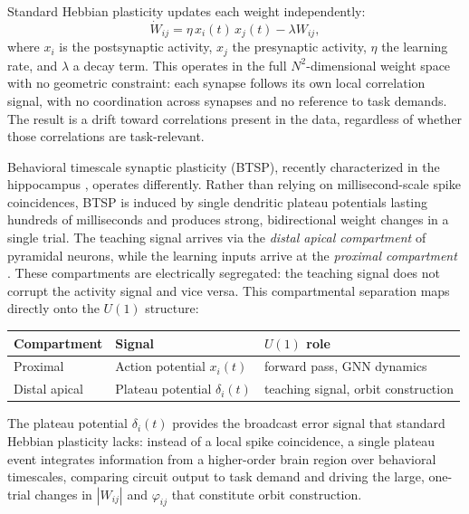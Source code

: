\documentclass[11pt]{article}
\begin{document}
Standard Hebbian plasticity updates each weight independently:
\begin{equation}
\dot{W}_{ij} = \eta\, x_i(t)\, x_j(t) - \lambda W_{ij},
\label{eq:hebbian}
\end{equation}
where $x_i$ is the postsynaptic activity, $x_j$ the presynaptic
activity, $\eta$ the learning rate, and $\lambda$ a decay term.
This operates in the full $N^2$-dimensional weight space with no
geometric constraint: each synapse follows its own local correlation
signal, with no coordination across synapses and no reference to
task demands. The result is a drift toward correlations present in
the data, regardless of whether those correlations are task-relevant.

Behavioral timescale synaptic plasticity (BTSP), recently
characterized in the hippocampus \citep{magee2026}, operates
differently. Rather than relying on millisecond-scale spike
coincidences, BTSP is induced by single dendritic plateau potentials
lasting hundreds of milliseconds and produces strong, bidirectional
weight changes in a single trial. The teaching signal arrives via
the \emph{distal apical compartment} of pyramidal neurons, while
the learning inputs arrive at the \emph{proximal compartment}
\citep{magee2026}. These compartments are electrically segregated:
the teaching signal does not corrupt the activity signal and
vice versa. This compartmental separation maps directly onto the
$U(1)$ structure:

\begin{center}
\renewcommand{\arraystretch}{1.3}
\begin{tabular}{@{}lll@{}}
\toprule
\textbf{Compartment} & \textbf{Signal} & \textbf{$U(1)$ role} \\
\midrule
Proximal & Action potential $x_i(t)$ & forward pass, GNN dynamics \\
Distal apical & Plateau potential $\delta_i(t)$ &
  teaching signal, orbit construction \\
\bottomrule
\end{tabular}
\end{center}

The plateau potential $\delta_i(t)$ provides the broadcast error
signal that standard Hebbian plasticity lacks: instead of a local
spike coincidence, a single plateau event integrates information
from a higher-order brain region over behavioral timescales,
comparing circuit output to task demand and driving the large,
one-trial changes in $|W_{ij}|$ and $\varphi_{ij}$ that constitute
orbit construction.
\end{document}
